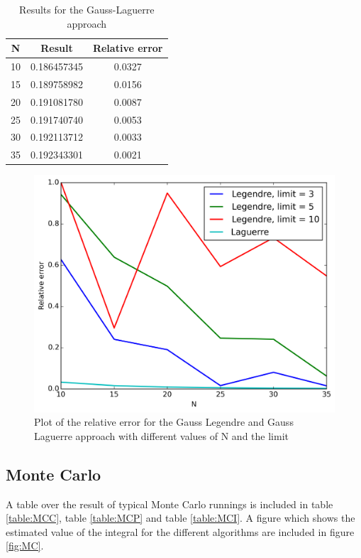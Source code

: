 \documentclass[11pt,a4paper,english,final]{article}
\numberwithin{equation}{section}
\newcommand{\figurewidth}{.85\textwidth}
\begin{document}
\begin{table}
\centering
\caption{Results for the Gauss-Laguerre approach} \vspace{2mm}
\begin{tabular}{|c|c|c|} \hline
N & Result & Relative error\\ \hline
10 & 0.186457345 & 0.0327 \\
15 & 0.189758982 & 0.0156 \\
20 & 0.191081780 & 0.0087 \\
25 & 0.191740740 & 0.0053 \\
30 & 0.192113712 & 0.0033 \\
35 & 0.192343301 & 0.0021
\\ \hline
\end{tabular}
\label{table:GLA}
\end{table}


\begin{figure}
\centering
\includegraphics[width=\figurewidth]{analyse/GQ_error.png}
\caption{Plot of the relative error for the Gauss Legendre and Gauss
Laguerre approach
with different values of N and the limit}
\label{fig:GQ}
\end{figure}


\subsection{Monte Carlo}

A table over the result of typical Monte Carlo runnings is included 
in table \ref{table:MCC}, table \ref{table:MCP} and 
table \ref{table:MCI}. A figure 
which shows the estimated value of the integral for the different
algorithms are 
included in figure \ref{fig:MC}.
\end{document}
